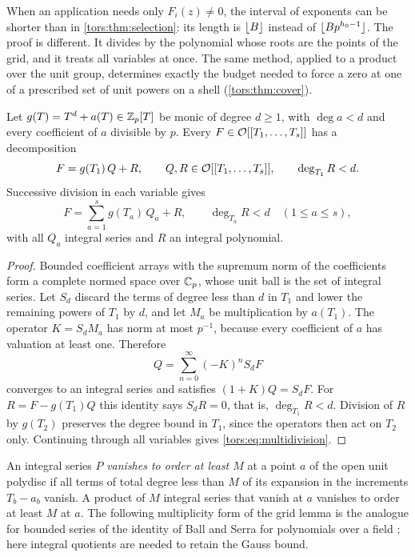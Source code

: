 When an application needs only $F_i(z)\ne0$, the interval of exponents can be shorter
than in \cref{tors:thm:selection}: its length is $\lfloor B\rfloor$ instead of
$\lfloor Bp^{h_0-1}\rfloor$. The proof is different. It divides by the polynomial whose roots
are the points of the grid, and it treats all variables at once. The same method, applied
to a product over the unit group, determines exactly the budget needed to force a zero at
one of a prescribed set of unit powers on a shell (\cref{tors:thm:cover}).

\begin{lemma}\label{tors:lem:division}
Let $g(T)=T^d+a(T)\in\mathbb{Z}_p[T]$ be monic of degree $d\ge1$, with $\deg a<d$ and every
coefficient of $a$ divisible by $p$. Every $F\in\mathcal{O}[[T_1,\dots,T_s]]$ has a decomposition
\[
  F=g(T_1)\,Q+R,\qquad Q,R\in\mathcal{O}[[T_1,\dots,T_s]],\qquad \deg_{T_1}R<d .
\]
Successive division in each variable gives
\begin{equation}\label{tors:eq:multidivision}
  F=\sum_{a=1}^sg(T_a)\,Q_a+R,\qquad \deg_{T_a}R<d\quad(1\le a\le s),
\end{equation}
with all $Q_a$ integral series and $R$ an integral polynomial.
\end{lemma}

\begin{proof}
Bounded coefficient arrays with the supremum norm of the coefficients form a complete
normed space over $\mathbb{C}_p$, whose unit ball is the set of integral series. Let $S_d$ discard
the terms of degree less than $d$ in $T_1$ and lower the remaining powers of $T_1$ by
$d$, and let $M_a$ be multiplication by $a(T_1)$. The operator $K=S_dM_a$ has norm at
most $p^{-1}$, because every coefficient of $a$ has valuation at least one. Therefore
\[
  Q=\sum_{n=0}^\infty(-K)^nS_dF
\]
converges to an integral series and satisfies $(1+K)Q=S_dF$. For $R=F-g(T_1)Q$ this
identity says $S_dR=0$, that is, $\deg_{T_1}R<d$. Division of $R$ by $g(T_2)$ preserves
the degree bound in $T_1$, since the operators then act on $T_2$ only. Continuing through
all variables gives \eqref{tors:eq:multidivision}.
\end{proof}

An integral series $P$ \emph{vanishes to order at least $M$} at a point $a$ of the open
unit polydisc if all terms of total degree less than $M$ of its expansion in the increments
$T_b-a_b$ vanish. A product of $M$ integral series that vanish at $a$ vanishes to order at
least $M$ at $a$. The following multiplicity form of the grid lemma is the analogue for
bounded series of the identity of Ball and Serra for polynomials over a field
\cite[Theorem~3.1]{BallSerra2009Punctured}; here integral quotients are needed to retain
the Gauss bound.

